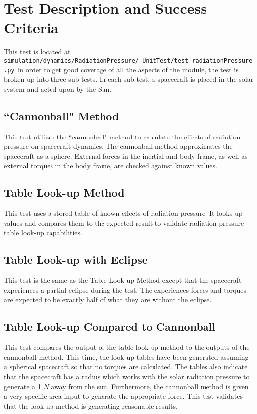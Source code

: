 \section{Test Description and Success Criteria}
This test is located at {\tt simulation/dynamics/RadiationPressure/\_UnitTest/test\_radiationPressure.py} In order to get good coverage of all the aspects of the module, the test is broken up into three sub-tests. In each sub-test, a spacecraft is placed in the solar system and acted upon by the Sun. \par

\subsection{``Cannonball" Method} This test utilizes the ``cannonball" method to calculate the effects of radiation pressure on spacecraft dynamics. The cannonball method approximates the spacecraft as a sphere. External forces in the inertial and body frame, as well as external torques in the body frame, are checked against known values.
\subsection{Table Look-up Method} This test uses a stored table of known effects of radiation pressure. It looks up values and compares them to the expected result to validate radiation pressure table look-up capabilities.
\subsection{Table Look-up with Eclipse} This test is the same as the Table Look-up Method except that the spacecraft experiences a partial eclipse during the test. The experiences forces and torques are expected to be exactly half of what they are without the eclipse.
\subsection{Table Look-up Compared to Cannonball} This test compares the output of the table look-up method to the outputs of the cannonball method. This time, the look-up tables have been generated assuming a spherical spacecraft so that no torques are calculated. The tables also indicate that the spacecraft has a radius which works with the solar radiation pressure to generate a 1 $N$ away from the sun. Furthermore, the cannonball method is given a very specific area input to generate the appropriate force. This test validates that the look-up method is generating reasonable results.

